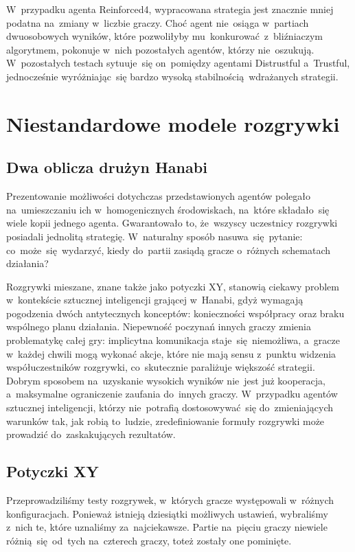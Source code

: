 \documentclass[declaration,shortabstract,inz]{iithesis}
\begin{document}
W~przypadku agenta Reinforced4, wypracowana strategia jest znacznie mniej podatna na~zmiany w~liczbie graczy. Choć agent nie~osiąga w~partiach dwuosobowych wyników, które pozwoliłyby mu~konkurować z~bliźniaczym algorytmem, pokonuje w~nich pozostałych agentów, którzy nie~oszukują. W~pozostałych testach sytuuje~się on~pomiędzy agentami Distrustful a~Trustful, jednocześnie wyróżniając~się bardzo wysoką stabilnością wdrażanych strategii.

\chapter{Niestandardowe modele rozgrywki}

\section{Dwa oblicza drużyn Hanabi}

Prezentowanie możliwości dotychczas przedstawionych agentów polegało na~umieszczaniu ich w~homogenicznych środowiskach, na~które składało~się wiele kopii jednego agenta. Gwarantowało to, że~wszyscy uczestnicy rozgrywki posiadali jednolitą strategię. W~naturalny sposób nasuwa~się pytanie: co~może~się wydarzyć, kiedy do~partii zasiądą gracze o~różnych schematach działania?

Rozgrywki mieszane, znane także jako potyczki XY, stanowią ciekawy problem w~kontekście sztucznej inteligencji grającej w~Hanabi, gdyż wymagają pogodzenia dwóch antytecznych konceptów: konieczności współpracy oraz braku wspólnego planu działania. Niepewność poczynań innych graczy zmienia problematykę całej gry: implicytna komunikacja staje~się niemożliwa, a~gracze w~każdej chwili mogą wykonać akcje, które nie mają sensu z~punktu widzenia współuczestników rozgrywki, co~skutecznie paraliżuje większość strategii. Dobrym sposobem na~uzyskanie wysokich wyników nie~jest już kooperacja, a~maksymalne ograniczenie zaufania do~innych graczy. W~przypadku agentów sztucznej inteligencji, którzy nie~potrafią dostosowywać~się do~zmieniających warunków tak, jak robią to~ludzie, zredefiniowanie formuły rozgrywki może prowadzić do~zaskakujących rezultatów.

\section{Potyczki XY}

Przeprowadziliśmy testy rozgrywek, w~których gracze występowali w~różnych konfiguracjach. Ponieważ istnieją dziesiątki możliwych ustawień, wybraliśmy z~nich te, które uznaliśmy za~najciekawsze. Partie na~pięciu graczy niewiele różnią~się od~tych na~czterech graczy, toteż zostały one pominięte.
\end{document}
